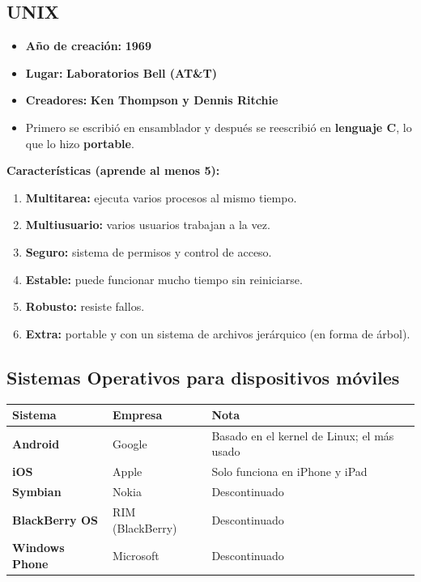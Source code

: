 \documentclass[11pt,a4paper]{article}
\newcommand{\clave}[1]{\textbf{\color{acento}#1}}
\begin{document}
\subsection{UNIX}
\begin{itemize}
  \item \textbf{Año de creación:} \clave{1969}
  \item \textbf{Lugar:} \clave{Laboratorios Bell (AT\&T)}
  \item \textbf{Creadores:} \clave{Ken Thompson y Dennis Ritchie}
  \item Primero se escribió en ensamblador y después se reescribió en \clave{lenguaje C}, lo que lo hizo \textbf{portable}.
\end{itemize}

\textbf{Características (aprende al menos 5):}
\begin{enumerate}
  \item \clave{Multitarea:} ejecuta varios procesos al mismo tiempo.
  \item \clave{Multiusuario:} varios usuarios trabajan a la vez.
  \item \clave{Seguro:} sistema de permisos y control de acceso.
  \item \clave{Estable:} puede funcionar mucho tiempo sin reiniciarse.
  \item \clave{Robusto:} resiste fallos.
  \item \textbf{Extra:} portable y con un sistema de archivos jerárquico (en forma de árbol).
\end{enumerate}

\subsection{Sistemas Operativos para dispositivos móviles}
\begin{tabularx}{\linewidth}{>{\raggedright\bfseries}p{3.4cm}>{\raggedright}p{3.6cm}L}
\toprule
Sistema & Empresa & Nota \\
\midrule
Android & Google & Basado en el kernel de Linux; el más usado \\
iOS & Apple & Solo funciona en iPhone y iPad \\
Symbian & Nokia & Descontinuado \\
BlackBerry OS & RIM (BlackBerry) & Descontinuado \\
Windows Phone & Microsoft & Descontinuado \\
\bottomrule
\end{tabularx}
\end{document}
